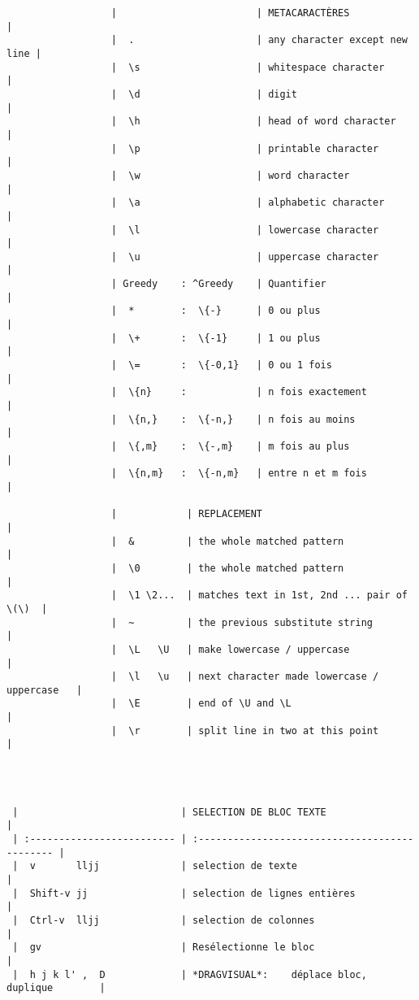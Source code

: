 \documentclass[10pt,landscape]{article}
\begin{document}
\begin{multicols}{2}
\begin{verbatim}
                  |                        | METACARACTÈRES                |
                  |  .                     | any character except new line |
                  |  \s                    | whitespace character          |
                  |  \d                    | digit                         |
                  |  \h                    | head of word character        |
                  |  \p                    | printable character           |
                  |  \w                    | word character                |
                  |  \a                    | alphabetic character          |
                  |  \l                    | lowercase character           |
                  |  \u                    | uppercase character           |
                  | Greedy    : ^Greedy    | Quantifier                    |
                  |  *        :  \{-}      | 0 ou plus                     |
                  |  \+       :  \{-1}     | 1 ou plus                     |
                  |  \=       :  \{-0,1}   | 0 ou 1 fois                   |
                  |  \{n}     :            | n fois exactement             |
                  |  \{n,}    :  \{-n,}    | n fois au moins               |
                  |  \{,m}    :  \{-,m}    | m fois au plus                |
                  |  \{n,m}   :  \{-n,m}   | entre n et m fois             |

                  |            | REPLACEMENT                                 |
                  |  &         | the whole matched pattern                   |
                  |  \0        | the whole matched pattern                   |
                  |  \1 \2...  | matches text in 1st, 2nd ... pair of  \(\)  |
                  |  ~         | the previous substitute string              |
                  |  \L   \U   | make lowercase / uppercase                  |
                  |  \l   \u   | next character made lowercase / uppercase   |
                  |  \E        | end of \U and \L                            |
                  |  \r        | split line in two at this point             |




 |                            | SELECTION DE BLOC TEXTE                        |
 | :------------------------- | :--------------------------------------------- |
 |  v       lljj              | selection de texte                             |
 |  Shift-v jj                | selection de lignes entières                   |
 |  Ctrl-v  lljj              | selection de colonnes                          |
 |  gv                        | Resélectionne le bloc                          |
 |  h j k l' ,  D             | *DRAGVISUAL*:    déplace bloc, duplique        |


\end{verbatim}
\end{multicols}
\end{document}
